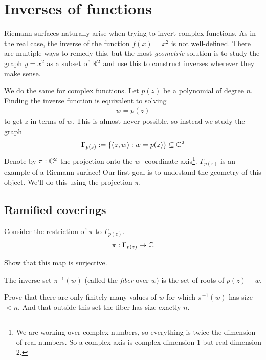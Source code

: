 \section{Inverses of functions}
Riemann surfaces naturally arise when trying to invert complex functions. As in the real case, the inverse of the function $f(x) = x^2$ is not well-defined. There are multiple ways to remedy this, but the most \emph{geometric} solution is to study the graph $y = x^2$ as a subset of $\mathbb{R}^2$ and use this to construct inverses wherever they make sense.

We do the same for complex functions. Let $p(z)$ be a polynomial of degree $n$. Finding the inverse function is equivalent to solving
\begin{align*}
  w = p(z)
\end{align*}
to get $z$ in terms of $w$.
This is almost never possible, so instead we study the graph
\begin{align*}
  \Gamma_{p(z)} :=
  \left\{ (z,w): w = p(z)\right\} \subseteq \mathbb{C}^2
\end{align*}
Denote by $\pi: \mathbb{C}^2$ the projection onto the $w$- coordinate axis\footnote{We are working over complex numbers, so everything is twice the dimension of real numbers. So a complex axis is complex dimension 1 but real dimension 2.}.
$\Gamma_{p(z)}$ is an example of a Riemann surface!
Our first goal is to undestand the geometry of this object. We'll do this using the projection $\pi$.













\subsection{Ramified coverings}
Consider the restriction of $\pi$ to $\Gamma_{p(z)}$.
\begin{align*}
  \pi : \Gamma_{p(z)} \rightarrow \mathbb{C}
\end{align*}
\begin{qbox}
  Show that this map is surjective.
\end{qbox}
The inverse set $\pi^{-1}(w)$ (called the \emph{fiber} over $w$) is the set of roots of $p(z) - w$.
\begin{qbox}
  Prove that there are only finitely many values of $w$ for which $\pi^{-1}(w)$ has size $< n$. And that outside this set the fiber has size exactly $n$.
\end{qbox}

